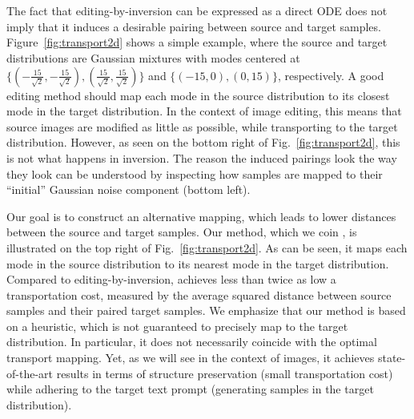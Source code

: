 \section{\ours{}}
\label{sec:flowedit}

The fact that editing-by-inversion can be expressed as a direct ODE does not imply that it induces a desirable pairing between source and target samples. Figure~\ref{fig:transport2d} shows a simple example, where the source and target distributions are Gaussian mixtures with modes centered at $\{(-\tfrac{15}{\sqrt{2}},-\frac{15}{\sqrt{2}}),(\tfrac{15}{\sqrt{2}},\tfrac{15}{\sqrt{2}})\}$ and $\{(-15,0),(0,15)\}$, respectively. A good editing method should map each mode in the source distribution to its closest mode in the target distribution. In the context of image editing, this means that source images are modified as little as possible, while transporting to the target distribution. However, as seen on the bottom right of Fig.~\ref{fig:transport2d}, this is not what happens in inversion. The reason the induced pairings look the way they look can be understood by inspecting how samples are mapped to their ``initial'' Gaussian noise component (bottom left).

Our goal is to construct an alternative mapping, which leads to lower distances between the source and target samples. Our method, which we coin \emph{\ours{}}, is illustrated on the top right
of Fig.~\ref{fig:transport2d}. As can be seen, it maps each mode in the source distribution to its nearest mode in the target distribution. Compared to editing-by-inversion, \ours{} achieves less than twice as low a transportation cost, measured by the average squared distance between source samples and their paired target samples. We emphasize that our method is based on a heuristic, which is not guaranteed to precisely map to the target distribution. In particular, it does not necessarily coincide with the optimal transport mapping. Yet, as we will see in the context of images, it achieves state-of-the-art results in terms of structure preservation (\ie small transportation cost) while adhering to the target text prompt (generating samples in the target distribution).

